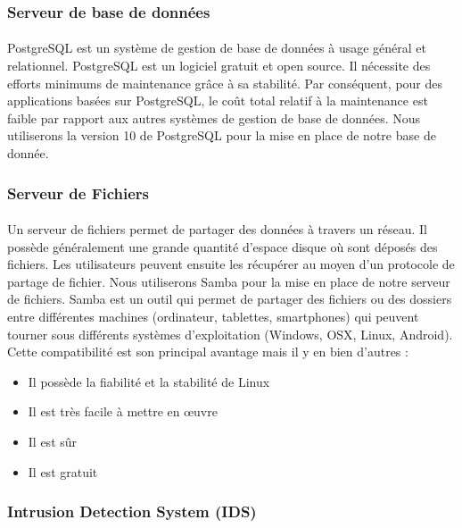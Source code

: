 	  \subsubsection{Serveur de base de donn\'ees}
	    \paragraph{}
	      PostgreSQL est un système de gestion de base de données à usage général et relationnel. PostgreSQL est un logiciel gratuit et open source. Il nécessite des efforts minimums de maintenance grâce à sa stabilité. Par conséquent, pour des applications basées sur PostgreSQL, le coût total relatif \`a la maintenance est faible par rapport aux autres systèmes de gestion de base de données. Nous utiliserons la version 10 de PostgreSQL pour la mise en place de notre base de donn\'ee.
	  
	  \subsubsection{Serveur de Fichiers}
	    \paragraph{}
	      Un serveur de fichiers permet de partager des données à travers un réseau. Il possède généralement une grande quantité d'espace disque où sont déposés des fichiers. Les utilisateurs peuvent ensuite les récupérer au moyen d'un protocole de partage de fichier. Nous utiliserons Samba pour la mise en place de notre serveur de fichiers. Samba est un outil qui permet de partager des fichiers ou des dossiers entre différentes machines (ordinateur, tablettes, smartphones) qui peuvent tourner sous différents systèmes d'exploitation (Windows, OSX, Linux, Android)\cite{samba}. Cette compatibilité est son principal avantage mais il y en bien d'autres :
	      \begin{itemize}
		  \item Il possède la fiabilité et la stabilité de Linux
		  \item Il est très facile à mettre en œuvre
		  \item Il est sûr
		  \item Il est gratuit
	      \end{itemize}
	      
	  
	  \subsubsection{Intrusion Detection System (IDS)}
